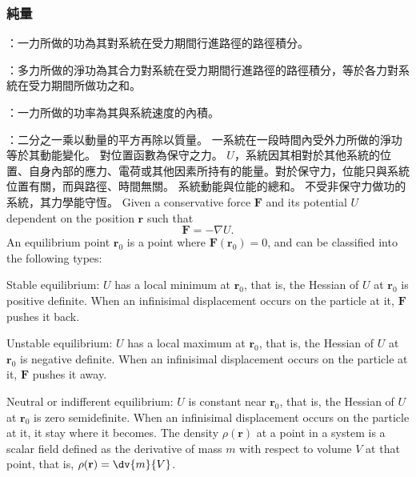 \documentclass[a4paper,12pt]{article}
\begin{document}
\subsubsection{純量}
\bit
\item{}：一力所做的功為其對系統在受力期間行進路徑的路徑積分。
\item{}：多力所做的淨功為其合力對系統在受力期間行進路徑的路徑積分，等於各力對系統在受力期間所做功之和。
\item{}：一力所做的功率為其與系統速度的內積。
\item{}：二分之一乘以動量的平方再除以質量。
\eit
{}
一系統在一段時間內受外力所做的淨功等於其動能變化。
對位置函數為保守之力。
$U$，系統因其相對於其他系統的位置、自身內部的應力、電荷或其他因素所持有的能量。對於保守力，位能只與系統位置有關，而與路徑、時間無關。
系統動能與位能的總和。
不受非保守力做功的系統，其力學能守恆。
Given a conservative force $\mathbf{F}$ and its potential $U$ dependent on the position $\mathbf{r}$ such that
\[\mathbf{F}=-\nabla U.\]
An equilibrium point $\mathbf{r}_0$ is a point where $\mathbf{F}(\mathbf{r}_0)=0$, and can be classified into the following types:
\bit
\item Stable equilibrium: $U$ has a local minimum at $\mathbf{r}_0$, that is, the Hessian of $U$ at $\mathbf{r}_0$ is positive definite. When an infinisimal displacement occurs on the particle at it, $\mathbf{F}$ pushes it back.
\item Unstable equilibrium: $U$ has a local maximum at $\mathbf{r}_0$, that is, the Hessian of $U$ at $\mathbf{r}_0$ is negative definite. When an infinisimal displacement occurs on the particle at it, $\mathbf{F}$ pushes it away.
\item Neutral or indifferent equilibrium: $U$ is constant near $\mathbf{r}_0$, that is, the Hessian of $U$ at $\mathbf{r}_0$ is zero semidefinite. When an infinisimal displacement occurs on the particle at it, it stay where it becomes.
\eit
{}
The density $\rho(\mathbf{r})$ at a point in a system is a scalar field defined as the derivative of mass $m$ with respect to volume $V$ at that point, that is, $\rho(\mathbf{r})=\dv{m}{V}$.
\end{document}
